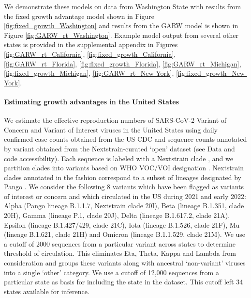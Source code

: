 \documentclass[11pt,oneside,letterpaper]{article}
\begin{document}
We demonstrate these models on data from Washington State with results from the fixed growth advantage model shown in Figure \ref{fig:fixed_growth_Washington} and results from the GARW model is shown in Figure \ref{fig:GARW_rt_Washington}.
Example model output from several other states is provided in the supplemental appendix in Figures \ref{fig:GARW_rt_California}, \ref{fig:fixed_growth_California}, \ref{fig:GARW_rt_Florida}, \ref{fig:fixed_growth_Florida}, \ref{fig:GARW_rt_Michigan}, \ref{fig:fixed_growth_Michigan}, \ref{fig:GARW_rt_New-York}, \ref{fig:fixed_growth_New-York}.

\paragraph{Estimating growth advantages in the United States}

We estimate the effective reproduction numbers of SARS-CoV-2 Variant of Concern and Variant of Interest viruses in the United States using daily confirmed case counts obtained from the US CDC and sequence counts annotated by variant obtained from the Nextstrain-curated `open' dataset \cite{Hadfield2018} (see Data and code accessibility).
Each sequence is labeled with a Nextstrain clade \cite{Hadfield2018}, and we partition clades into variants based on WHO VOC/VOI designation \cite{Konings2021}.
Nextstrain clades annotated in the fashion correspond to a subset of lineages designated by Pango \cite{Rambaut2020}.
We consider the following 8 variants which have been flagged as variants of interest or concern and which circulated in the US during 2021 and early 2022: Alpha (Pango lineage B.1.1.7, Nextstrain clade 20I), Beta (lineage B.1.351, clade 20H), Gamma (lineage P.1, clade 20J), Delta (lineage B.1.617.2, clade 21A), Epsilon (lineage B.1.427/429, clade 21C), Iota (lineage B.1.526, clade 21F), Mu (lineage B.1.621, clade 21H) and Omicron (lineage B.1.1.529, clade 21M).
We use a cutoff of 2000 sequences from a particular variant across states to determine threshold of circulation.
This eliminates Eta, Theta, Kappa and Lambda from consideration and groups these variants along with ancestral `non-variant' viruses into a single `other' category.
We use a cutoff of 12,000 sequences from a particular state as basis for including the state in the dataset.
This cutoff left 34 states available for inference.
\end{document}
